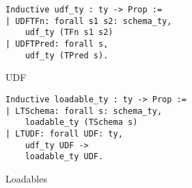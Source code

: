 \begin{figure}
\begin{lstlisting}
Inductive udf_ty : ty -> Prop := 
| UDFTFn: forall s1 s2: schema_ty,
    udf_ty (TFn s1 s2)
| UDFTPred: forall s,
    udf_ty (TPred s).
\end{lstlisting}
\caption{UDF}
\label{fig-udf}
\end{figure}

\begin{figure}
\begin{lstlisting}
Inductive loadable_ty : ty -> Prop :=
| LTSchema: forall s: schema_ty,
    loadable_ty (TSchema s)
| LTUDF: forall UDF: ty,
    udf_ty UDF ->
    loadable_ty UDF.
\end{lstlisting}
\caption{Loadables}
\label{fig-loadable}
\end{figure}



%

